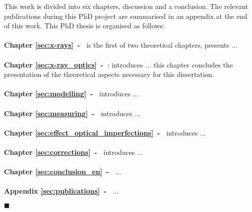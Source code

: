 This work is divided into six chapters, discussion and a conclusion. The relevant publications during this PhD project are summarised in an appendix at the end of this work. This PhD thesis is organised as follows:
\\
\\
\textbf{Chapter \ref{sec:x-rays}~-~} is the first of two theoretical chapters, presents ...
\\
\\
\textbf{Chapter \ref{sec:x-ray_optics}~-~}: introduces ... this chapter concludes the presentation of the theoretical aspects necessary for this dissertation.
\\
\\
\textbf{Chapter \ref{sec:modelling}~-~} introduces ...
\\
\\
\textbf{Chapter \ref{sec:measuring}~-~} introduces ...
\\
\\
\textbf{Chapter \ref{sec:effect_optical_imperfections}~-~} introduces ...
\\
\\
\textbf{Chapter \ref{sec:corrections}~-~} introduces ...
\\
\\
\textbf{Chapter \ref{sec:conclusion_en}~-~}  ...
\\
\\
\textbf{Appendix \ref{sec:publications}~-~}  ...

$\blacksquare$